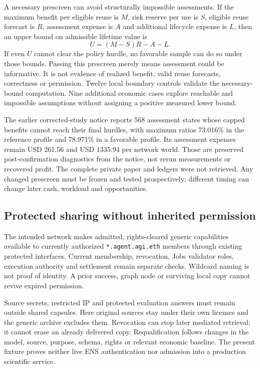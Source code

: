 A necessary prescreen can avoid structurally impossible assessments. If the maximum benefit per eligible reuse is $M$, risk reserve per use is $S$, eligible reuse forecast is $R$, assessment expense is $A$ and additional lifecycle expense is $L$, then an upper bound on admissible lifetime value is
\begin{equation}
U=(M-S)R-A-L.
\end{equation}
If even $U$ cannot clear the policy hurdle, no favorable sample can do so under those bounds. Passing this prescreen merely means assessment could be informative. It is not evidence of realized benefit, valid reuse forecasts, correctness or permission. Twelve local boundary controls validate the necessary-bound computation. Nine additional economic cases explore reachable and impossible assumptions without assigning a positive measured lower bound.

The earlier corrected-study notice reports 568 assessment states whose capped benefits cannot reach their final hurdles, with maximum ratios 73.016\% in the reference profile and 78.971\% in a favorable profile. Its assessment expenses remain USD 261.56 and USD 1335.94 per network world. Those are preserved post-confirmation diagnostics from the notice, not rerun measurements or recovered profit. The complete private paper and ledgers were not retrieved.\citep{advantage} Any changed prescreen must be frozen and tested prospectively; different timing can change later cash, workload and opportunities.

\subsection{Protected sharing without inherited permission}

The intended network makes admitted, rights-cleared generic capabilities available to currently authorized \texttt{*.agent.agi.eth} members through existing protected interfaces. Current membership, revocation, Jobs validator roles, execution authority and settlement remain separate checks. Wildcard naming is not proof of identity. A prior success, graph node or surviving local copy cannot revive expired permission.

Source secrets, restricted IP and protected evaluation answers must remain outside shared capsules. Here original sources stay under their own licenses and the generic archive excludes them. Revocation can stop later mediated retrieval; it cannot erase an already delivered copy. Requalification follows changes in the model, source, purpose, schema, rights or relevant economic baseline. The present fixture proves neither live ENS authentication nor admission into a production scientific service.

